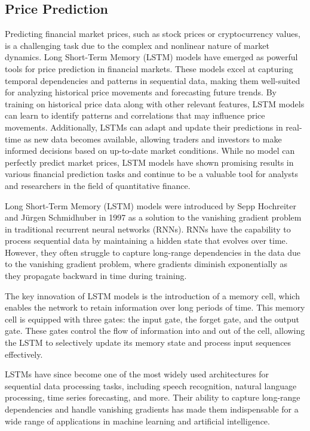 \subsection{Price Prediction}

Predicting financial market prices, such as stock prices or cryptocurrency values, is a challenging task due to the complex and nonlinear nature of market dynamics. Long Short-Term Memory (LSTM) models have emerged as powerful tools for price prediction in financial markets. These models excel at capturing temporal dependencies and patterns in sequential data, making them well-suited for analyzing historical price movements and forecasting future trends. By training on historical price data along with other relevant features, LSTM models can learn to identify patterns and correlations that may influence price movements. Additionally, LSTMs can adapt and update their predictions in real-time as new data becomes available, allowing traders and investors to make informed decisions based on up-to-date market conditions. While no model can perfectly predict market prices, LSTM models have shown promising results in various financial prediction tasks and continue to be a valuable tool for analysts and researchers in the field of quantitative finance.


Long Short-Term Memory (LSTM) models were introduced by Sepp Hochreiter and Jürgen Schmidhuber in 1997\cite{Hochreiter1997} as a solution to the vanishing gradient problem in traditional recurrent neural networks (RNNs). RNNs have the capability to process sequential data by maintaining a hidden state that evolves over time. However, they often struggle to capture long-range dependencies in the data due to the vanishing gradient problem, where gradients diminish exponentially as they propagate backward in time during training.

The key innovation of LSTM models is the introduction of a memory cell, which enables the network to retain information over long periods of time. This memory cell is equipped with three gates: the input gate, the forget gate, and the output gate. These gates control the flow of information into and out of the cell, allowing the LSTM to selectively update its memory state and process input sequences effectively.

LSTMs have since become one of the most widely used architectures for sequential data processing tasks, including speech recognition, natural language processing, time series forecasting, and more. Their ability to capture long-range dependencies and handle vanishing gradients has made them indispensable for a wide range of applications in machine learning and artificial intelligence.

